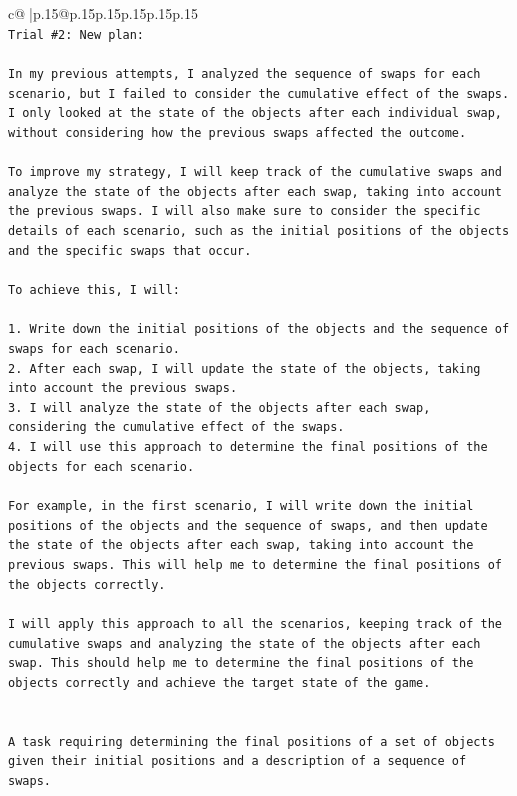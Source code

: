 \documentclass{article}
\begin{document}
{\begin{supertabular}{c@{$\;$}|p{.15\linewidth}@{}p{.15\linewidth}p{.15\linewidth}p{.15\linewidth}p{.15\linewidth}p{.15\linewidth}}
{{{\\ 
\texttt{Trial \#2: New plan: } \\
\\ 
\texttt{In my previous attempts, I analyzed the sequence of swaps for each scenario, but I failed to consider the cumulative effect of the swaps. I only looked at the state of the objects after each individual swap, without considering how the previous swaps affected the outcome.} \\
\\ 
\texttt{To improve my strategy, I will keep track of the cumulative swaps and analyze the state of the objects after each swap, taking into account the previous swaps. I will also make sure to consider the specific details of each scenario, such as the initial positions of the objects and the specific swaps that occur.} \\
\\ 
\texttt{To achieve this, I will:} \\
\\ 
\texttt{1. Write down the initial positions of the objects and the sequence of swaps for each scenario.} \\
\texttt{2. After each swap, I will update the state of the objects, taking into account the previous swaps.} \\
\texttt{3. I will analyze the state of the objects after each swap, considering the cumulative effect of the swaps.} \\
\texttt{4. I will use this approach to determine the final positions of the objects for each scenario.} \\
\\ 
\texttt{For example, in the first scenario, I will write down the initial positions of the objects and the sequence of swaps, and then update the state of the objects after each swap, taking into account the previous swaps. This will help me to determine the final positions of the objects correctly.} \\
\\ 
\texttt{I will apply this approach to all the scenarios, keeping track of the cumulative swaps and analyzing the state of the objects after each swap. This should help me to determine the final positions of the objects correctly and achieve the target state of the game.} \\
\\ 
\\ 
\texttt{A task requiring determining the final positions of a set of objects given their initial positions and a description of a sequence of swaps.} \\
}}}
\end{supertabular}}
\end{document}
